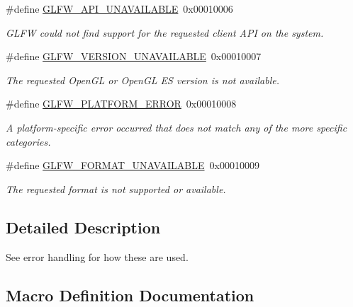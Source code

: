 \begin{DoxyCompactItemize}
\#define \hyperlink{group__errors_ga56882b290db23261cc6c053c40c2d08e}{G\+L\+F\+W\+\_\+\+A\+P\+I\+\_\+\+U\+N\+A\+V\+A\+I\+L\+A\+B\+L\+E}~0x00010006
\begin{DoxyCompactList}\small\item\em G\+L\+F\+W could not find support for the requested client A\+P\+I on the system. \end{DoxyCompactList}\item 
\#define \hyperlink{group__errors_gad16c5565b4a69f9c2a9ac2c0dbc89462}{G\+L\+F\+W\+\_\+\+V\+E\+R\+S\+I\+O\+N\+\_\+\+U\+N\+A\+V\+A\+I\+L\+A\+B\+L\+E}~0x00010007
\begin{DoxyCompactList}\small\item\em The requested Open\+G\+L or Open\+G\+L E\+S version is not available. \end{DoxyCompactList}\item 
\#define \hyperlink{group__errors_gad44162d78100ea5e87cdd38426b8c7a1}{G\+L\+F\+W\+\_\+\+P\+L\+A\+T\+F\+O\+R\+M\+\_\+\+E\+R\+R\+O\+R}~0x00010008
\begin{DoxyCompactList}\small\item\em A platform-\/specific error occurred that does not match any of the more specific categories. \end{DoxyCompactList}\item 
\#define \hyperlink{group__errors_ga196e125ef261d94184e2b55c05762f14}{G\+L\+F\+W\+\_\+\+F\+O\+R\+M\+A\+T\+\_\+\+U\+N\+A\+V\+A\+I\+L\+A\+B\+L\+E}~0x00010009
\begin{DoxyCompactList}\small\item\em The requested format is not supported or available. \end{DoxyCompactList}\end{DoxyCompactItemize}


\subsection{Detailed Description}
See error handling for how these are used. 

\subsection{Macro Definition Documentation}
\hypertarget{group__errors_ga56882b290db23261cc6c053c40c2d08e}{}
